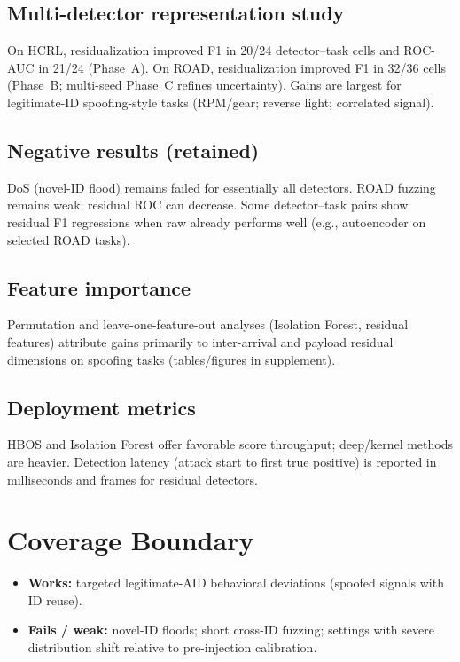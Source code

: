 \documentclass[conference]{IEEEtran}
\begin{document}
\subsection{Multi-detector representation study}
On HCRL, residualization improved F1 in 20/24 detector--task cells and ROC-AUC in 21/24 (Phase~A).
On ROAD, residualization improved F1 in 32/36 cells (Phase~B; multi-seed Phase~C refines uncertainty).
Gains are largest for legitimate-ID spoofing-style tasks (RPM/gear; reverse light; correlated signal).

\subsection{Negative results (retained)}
DoS (novel-ID flood) remains failed for essentially all detectors.
ROAD fuzzing remains weak; residual ROC can decrease.
Some detector--task pairs show residual F1 regressions when raw already performs well (e.g., autoencoder on selected ROAD tasks).

\subsection{Feature importance}
Permutation and leave-one-feature-out analyses (Isolation Forest, residual features) attribute gains primarily to inter-arrival and payload residual dimensions on spoofing tasks (tables/figures in supplement).

\subsection{Deployment metrics}
HBOS and Isolation Forest offer favorable score throughput; deep/kernel methods are heavier.
Detection latency (attack start to first true positive) is reported in milliseconds and frames for residual detectors.

\section{Coverage Boundary}
\begin{itemize}
\item \textbf{Works:} targeted legitimate-AID behavioral deviations (spoofed signals with ID reuse).
\item \textbf{Fails / weak:} novel-ID floods; short cross-ID fuzzing; settings with severe distribution shift relative to pre-injection calibration.
\end{itemize}
\end{document}
